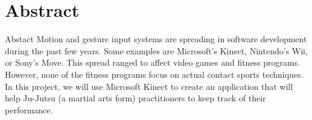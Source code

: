 \chapter*{Abstract}
\label{chap:abstract}
Abstact
Motion and gesture input systems are spreading in software development during the past few years. Some examples are Microsoft's Kinect, Nintendo's Wii, or Sony's Move.
This spread ranged to affect video games and fitness programs. However, none of the fitness programs focus on actual contact sports techniques.
In this project, we will use Microsoft Kinect to create an application that will help Ju-Jutsu (a martial arts form) practitioners to keep track of their performance.

